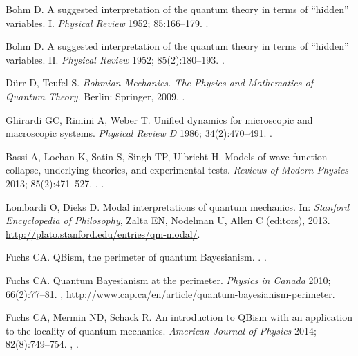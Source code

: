 \documentclass[DIV=calc,fontsize=12pt]{scrartcl} %
\theoremstyle{definition}
\theoremstyle{plain}
\begin{document}
\begin{thebibliography}{10}
Bohm D.
\newblock A suggested interpretation of the quantum theory in terms of ``hidden'' variables. I.
\newblock \emph{Physical Review} 1952; 85:166--179.
\newblock \href {http://dx.doi.org/10.1103/PhysRev.85.166}
{}.

Bohm D.
\newblock A suggested interpretation of the quantum theory in terms of ``hidden'' variables. II.
\newblock \emph{Physical Review} 1952; 85(2):180--193.
\newblock \href {http://dx.doi.org/10.1103/PhysRev.85.180}
{}.

D{\"u}rr D, Teufel S.
\newblock \emph{Bohmian Mechanics. The Physics and Mathematics of Quantum Theory}.
\newblock Berlin: Springer, 2009.
\newblock \href {http://dx.doi.org/10.1007/b99978}
{}.

Ghirardi GC, Rimini A, Weber T.
\newblock Unified dynamics for microscopic and macroscopic systems.
\newblock \emph{Physical Review D} 1986; 34(2):470--491.
\newblock \href {http://dx.doi.org/10.1103/PhysRevD.34.470}
{}.

Bassi A, Lochan K, Satin S, Singh TP, Ulbricht H.
\newblock Models of wave-function collapse, underlying theories, and experimental tests.
\newblock \emph{Reviews of Modern Physics} 2013; 85(2):471--527.
\newblock \href {http://arxiv.org/abs/1204.4325} {},
\href {http://dx.doi.org/10.1103/RevModPhys.85.471}
{}.

Lombardi O, Dieks D.
\newblock Modal interpretations of quantum mechanics.
\newblock In: \emph{Stanford Encyclopedia of Philosophy}, Zalta EN, Nodelman U, Allen C (editors), 2013.
\newblock \url{http://plato.stanford.edu/entries/qm-modal/}.

Fuchs CA.
\newblock QBism, the perimeter of quantum Bayesianism.
.
\newblock \href {http://arxiv.org/abs/1003.5209} {}.

Fuchs CA.
\newblock Quantum Bayesianism at the perimeter.
\newblock \emph{Physics in Canada} 2010; 66(2):77--81.
\newblock \href{http://arxiv.org/abs/1003.5182}{}, \url{http://www.cap.ca/en/article/quantum-bayesianism-perimeter}.

Fuchs CA, Mermin ND, Schack R.
\newblock An introduction to QBism with an application to the locality
of quantum mechanics.
\newblock \emph{American Journal of Physics} 2014; 82(8):749--754.
\newblock \href {http://arxiv.org/abs/1311.5253} {},
\href {http://dx.doi.org/10.1119/1.4874855}
{}.


\end{thebibliography}
\end{document}
